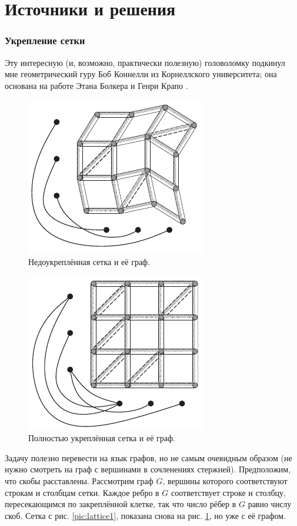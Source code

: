 \section*{Источники и решения}

\subsubsection*{Укрепление сетки}

Эту интересную (и, возможно, практически полезную) головоломку подкинул мне геометрический гуру Боб Коннелли из Корнеллского университета; она основана на работе Этана Болкера и Генри Крапо \cite{8}.


\begin{figure}[ht!]
\centering
\includegraphics[scale=1]{pics/lattice2}
\caption{Недоукреплённая сетка и её граф.}
\label{pic:lattice2}
\end{figure}

\begin{figure}[t!]
\centering
\includegraphics[scale=1]{pics/lattice3}
\caption{Полностью укреплённая сетка и её граф.}
\label{pic:lattice3}
\end{figure}

Задачу полезно перевести на язык графов, но не самым очевидным образом (не нужно смотреть на граф с вершинами в сочленениях стержней).
Предположим, что скобы расставлены.
Рассмотрим граф $G$, вершины которого соответствуют строкам и столбцам сетки.
Каждое ребро в $G$ соответствует строке и столбцу, пересекающимся по закреплённой клетке, так что число рёбер в $G$ равно числу скоб.
Сетка с рис. \ref{pic:lattice1}, показана снова на рис. \ref{pic:lattice2}, но уже с её графом.

